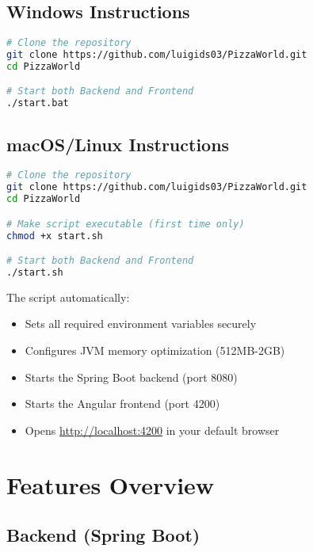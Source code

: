 \documentclass[11pt,a4paper]{article}
\begin{document}
\subsection{Windows Instructions}

\begin{lstlisting}[language=bash, caption=Windows Installation]
# Clone the repository
git clone https://github.com/luigids03/PizzaWorld.git
cd PizzaWorld

# Start both Backend and Frontend
./start.bat
\end{lstlisting}

\subsection{macOS/Linux Instructions}

\begin{lstlisting}[language=bash, caption=macOS/Linux Installation]
# Clone the repository
git clone https://github.com/luigids03/PizzaWorld.git
cd PizzaWorld

# Make script executable (first time only)
chmod +x start.sh

# Start both Backend and Frontend
./start.sh
\end{lstlisting}

The script automatically:
\begin{itemize}[leftmargin=*]
    \item Sets all required environment variables securely
    \item Configures JVM memory optimization (512MB-2GB)
    \item Starts the Spring Boot backend (port 8080)
    \item Starts the Angular frontend (port 4200)
    \item Opens \href{http://localhost:4200}{http://localhost:4200} in your default browser
\end{itemize}

\section{Features Overview}

\subsection{Backend (Spring Boot)}
\end{document}
